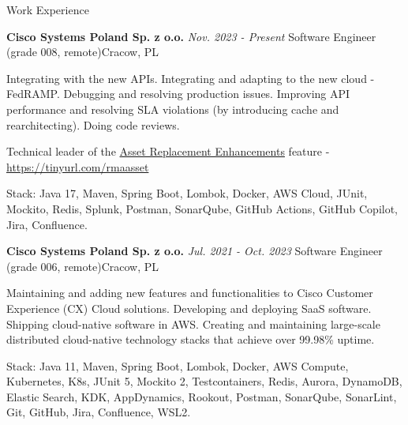 \documentclass{resume}
\begin{document}

\begin{rSection}{Work Experience}

    \begin{rSubsection}
        {\bf Cisco Systems Poland Sp. z o.o.}
        {\em Nov. 2023 - Present}
        {\normalfont Software Engineer (grade 008, remote)}{Cracow, PL}

        \item[] {Integrating with the new APIs. Integrating and adapting to the new cloud - FedRAMP. Debugging and resolving production issues. Improving API performance and resolving SLA violations (by introducing cache and rearchitecting). Doing code reviews.}
        \item[] {Technical leader of the \underline{Asset Replacement Enhancements} feature - \url{https://tinyurl.com/rmaasset}}
        \item[] {Stack: Java 17, Maven, Spring Boot, Lombok, Docker, AWS Cloud, JUnit, Mockito, Redis, Splunk, Postman, SonarQube, GitHub Actions, GitHub Copilot, Jira, Confluence.}

    \end{rSubsection}

    \begin{rSubsection}
        {\bf Cisco Systems Poland Sp. z o.o.}
        {\em Jul. 2021 - Oct. 2023}
        {\normalfont Software Engineer (grade 006, remote)}{Cracow, PL}

        \item[] {Maintaining and adding new features and functionalities to Cisco Customer Experience (CX) Cloud solutions.
                    Developing and deploying SaaS software. Shipping cloud-native software in AWS.
                    Creating and maintaining large-scale distributed cloud-native technology stacks that achieve over 99.98\% uptime.}
        \item[] {Stack: Java 11, Maven, Spring Boot, Lombok, Docker, AWS Compute, Kubernetes, K8s, JUnit 5, Mockito 2, Testcontainers, Redis, Aurora, DynamoDB,
                    Elastic Search, KDK, AppDynamics, Rookout, Postman, SonarQube, SonarLint, Git, GitHub, Jira, Confluence, WSL2.}


\end{rSubsection}
\end{rSection}
\end{document}
